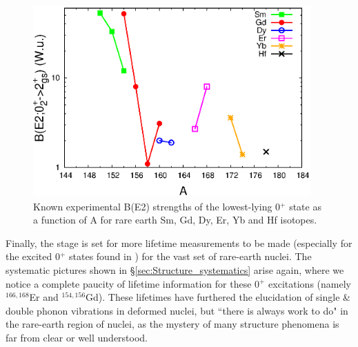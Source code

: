 \begin{figure}[h!]
\begin{center}
\includegraphics[width=0.95\textwidth]{Rare_Earth_02_BE2.eps}
\end{center}
\caption{Known experimental B(E2) strengths of the lowest-lying 0$^+$ state as a function of A for rare earth Sm, Gd, Dy, Er, Yb and Hf isotopes. \label{fig:Rare_earth_02_BE2}}
\end{figure}

Finally, the stage is set for more lifetime measurements to be made (especially for the excited 0$^+$ states found in \cite{Meyer_pt0_2006}) for the vast set of rare-earth nuclei. The systematic pictures shown in \S \ref{sec:Structure_systematics} arise again, where we notice a complete paucity of lifetime information for these 0$^+$ excitations (namely $^{166,168}$Er and $^{154,156}$Gd). These lifetimes have furthered the elucidation of single \& double phonon vibrations in deformed nuclei, but ``there is always work to do" in the rare-earth region of nuclei, as the mystery of many structure phenomena is far from clear or well understood.

